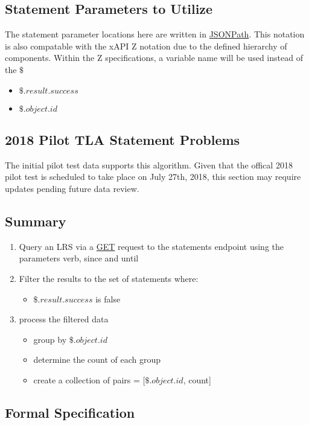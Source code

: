 \documentclass{article}
\begin{document}
\subsection{Statement Parameters to Utilize}
The statement parameter locations here are written in
\href{http://goessner.net/articles/JsonPath/}{JSONPath}. This notation
is also compatable with the xAPI Z notation due to the defined
hierarchy of components. Within the Z specifications, a variable name
will be used instead of the $\$$
\begin{itemize}
\item $\$.result.success$
\item $\$.object.id$
\end{itemize}

\subsection{2018 Pilot TLA Statement Problems}
The initial pilot test data supports this algorithm.
Given that the offical 2018 pilot test is scheduled to take place on July
27th, 2018, this section may require updates pending future data review.

\subsection{Summary}

\begin{enumerate}
\item Query an LRS via a \href{https://github.com/adlnet/xAPI-Spec/blob/master/xAPI-Communication.md#213-get-statements}{GET} request to the statements endpoint using the parameters verb, since and until
\item Filter the results to the set of statements where:
  \begin{itemize}
  \item $\$.result.success$ is false
  \end{itemize}
\item process the filtered data
  \begin{itemize}
  \item group by $\$.object.id$
  \item determine the count of each group
  \item create a collection of pairs = [$\$.object.id$, count]
  \end{itemize}
\end{enumerate}

\subsection{Formal Specification}
\end{document}
